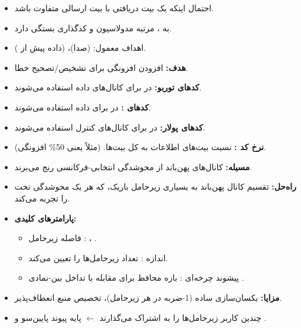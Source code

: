 

\CNchained{}

\begin{itemize}
\tightlist
\item
  احتمال اینکه یک بیت دریافتی با بیت ارسالی متفاوت باشد.
\item
  به ، مرتبه مدولاسیون و کدگذاری بستگی دارد.
\item
  اهداف معمول:  (صدا)،  (داده پیش از ).
\end{itemize}


\begin{itemize}
\tightlist
\item
  \textbf{هدف:} افزودن افزونگی برای تشخیص/\allowbreak{}تصحیح خطا.
\item
  \textbf{کدهای توربو:} در  برای کانال‌های داده استفاده می‌شوند.
\item
  \textbf{کدهای :} در  برای داده  استفاده می‌شوند.
\item
  \textbf{کدهای پولار:} در  برای کانال‌های کنترل استفاده می‌شوند.
\item
  \textbf{نرخ کد :} نسبت بیت‌های اطلاعات به کل بیت‌ها.  (مثلاً  یعنی 50\% افزونگی).
\end{itemize}


\begin{itemize}
\tightlist
\item
  \textbf{مسیله:} کانال‌های پهن‌باند از محوشدگی انتخابی-فرکانسی رنج می‌برند.
\item
  \textbf{راه‌حل:} تقسیم کانال پهن‌باند به بسیاری زیرحامل باریک، که هر یک محوشدگی تخت را تجربه می‌کند.
\item
  \textbf{پارامترهای کلیدی:}

  \begin{itemize}
  \tightlist
  \item
    فاصله زیرحامل : ، .
  \item
    اندازه : تعداد زیرحامل‌ها را تعیین می‌کند.
  \item
    پیشوند چرخه‌ای : بازه محافظ برای مقابله با تداخل بین-نمادی .
  \end{itemize}
\item
  \textbf{مزایا:} یکسان‌سازی ساده (1-ضربه در هر زیرحامل)، تخصیص منبع انعطاف‌پذیر.
\item
   چندین کاربر زیرحامل‌ها را به اشتراک می‌گذارند \ensuremath{\leftarrow} پایه پیوند پایین‌سو  و .
\end{itemize}

